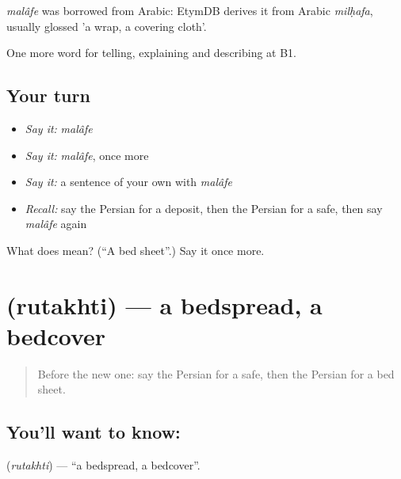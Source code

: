 \begin{cousinweb}
\emph{malâfe} was borrowed from Arabic: EtymDB derives it from Arabic \emph{milḥafa}, usually glossed 'a wrap, a covering cloth'.
\end{cousinweb}

\begin{grammarlens}[title={What you've built}]
One more word for telling, explaining and describing at B1.
\end{grammarlens}

\subsection*{Your turn}
\begin{itemize}
\raggedright
  \item \emph{Say it:} \emph{malâfe}
  \item \emph{Say it:} \emph{malâfe}, once more
  \item \emph{Say it:} a sentence of your own with \emph{malâfe}
  \item \emph{Recall:} say the Persian for a deposit, then the Persian for a safe, then say \emph{malâfe} again
\end{itemize}

\begin{tcolorbox}[breakable,colback=teal!4,colframe=teal!35!black,title={Before you move on}]
What does  mean? (\textquotedblleft{}A bed sheet\textquotedblright{}.) Say it once more.
\end{tcolorbox}
\section[\texorpdfstring{\fa{روتختی} (rutakhti)}{روتختی (rutakhti)}]{ (rutakhti) — a bedspread, a bedcover}

\label{lesson:FA-C439-rutakhti}



\begin{quote}
Before the new one: say the Persian for a safe, then the Persian for a bed sheet.
\end{quote}

\subsection*{You'll want to know: }
\textbf{} (\emph{rutakhti}) — \textquotedblleft{}a bedspread, a bedcover\textquotedblright{}.

